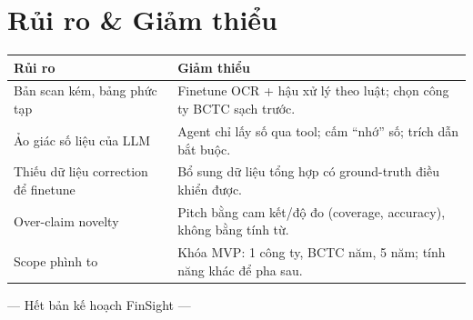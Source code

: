 \documentclass[11pt,a4paper]{article}
\begin{document}
\section{Rủi ro \& Giảm thiểu}
\renewcommand{\arraystretch}{1.2}
\begin{longtable}{>{\raggedright\arraybackslash}p{6.2cm} >{\raggedright\arraybackslash}p{8.6cm}}
\toprule
\textbf{Rủi ro} & \textbf{Giảm thiểu} \\
\midrule
\endhead
Bản scan kém, bảng phức tạp & Finetune OCR + hậu xử lý theo luật; chọn công ty BCTC sạch trước. \\
Ảo giác số liệu của LLM & Agent chỉ lấy số qua tool; cấm ``nhớ'' số; trích dẫn bắt buộc. \\
Thiếu dữ liệu correction để finetune & Bổ sung dữ liệu tổng hợp có ground-truth điều khiển được. \\
Over-claim novelty & Pitch bằng cam kết/độ đo (coverage, accuracy), không bằng tính từ. \\
Scope phình to & Khóa MVP: 1 công ty, BCTC năm, 5 năm; tính năng khác để pha sau. \\
\bottomrule
\end{longtable}

\vspace{0.4cm}
\begin{center}
\color{fsgray}\small --- Hết bản kế hoạch FinSight ---
\end{center}
\end{document}
